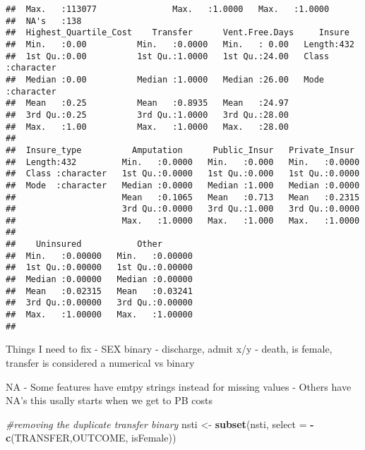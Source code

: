 \documentclass[]{article}
\newenvironment{Shaded}{\begin{snugshade}}{\end{snugshade}}
\newcommand{\CommentTok}[1]{\textcolor[rgb]{0.56,0.35,0.01}{\textit{#1}}}
\newcommand{\DataTypeTok}[1]{\textcolor[rgb]{0.13,0.29,0.53}{#1}}
\newcommand{\KeywordTok}[1]{\textcolor[rgb]{0.13,0.29,0.53}{\textbf{#1}}}
\newcommand{\NormalTok}[1]{#1}
\newcommand{\OperatorTok}[1]{\textcolor[rgb]{0.81,0.36,0.00}{\textbf{#1}}}
\newcommand{\StringTok}[1]{\textcolor[rgb]{0.31,0.60,0.02}{#1}}
\begin{document}
\begin{verbatim}
##  Max.   :113077               Max.   :1.0000   Max.   :1.0000  
##  NA's   :138                                                   
##  Highest_Quartile_Cost    Transfer      Vent.Free.Days     Insure         
##  Min.   :0.00          Min.   :0.0000   Min.   : 0.00   Length:432        
##  1st Qu.:0.00          1st Qu.:1.0000   1st Qu.:24.00   Class :character  
##  Median :0.00          Median :1.0000   Median :26.00   Mode  :character  
##  Mean   :0.25          Mean   :0.8935   Mean   :24.97                     
##  3rd Qu.:0.25          3rd Qu.:1.0000   3rd Qu.:28.00                     
##  Max.   :1.00          Max.   :1.0000   Max.   :28.00                     
##                                                                           
##  Insure_type          Amputation      Public_Insur   Private_Insur   
##  Length:432         Min.   :0.0000   Min.   :0.000   Min.   :0.0000  
##  Class :character   1st Qu.:0.0000   1st Qu.:0.000   1st Qu.:0.0000  
##  Mode  :character   Median :0.0000   Median :1.000   Median :0.0000  
##                     Mean   :0.1065   Mean   :0.713   Mean   :0.2315  
##                     3rd Qu.:0.0000   3rd Qu.:1.000   3rd Qu.:0.0000  
##                     Max.   :1.0000   Max.   :1.000   Max.   :1.0000  
##                                                                      
##    Uninsured           Other        
##  Min.   :0.00000   Min.   :0.00000  
##  1st Qu.:0.00000   1st Qu.:0.00000  
##  Median :0.00000   Median :0.00000  
##  Mean   :0.02315   Mean   :0.03241  
##  3rd Qu.:0.00000   3rd Qu.:0.00000  
##  Max.   :1.00000   Max.   :1.00000  
## 
\end{verbatim}

Things I need to fix - SEX binary - discharge, admit x/y - death, is
female, transfer is considered a numerical vs binary

NA - Some features have emtpy strings instead for missing values -
Others have NA's this usally starts when we get to PB costs

\begin{Shaded}
\begin{Highlighting}[]
\CommentTok{#removing the duplicate transfer binary }
\NormalTok{nsti <-}\StringTok{ }\KeywordTok{subset}\NormalTok{(nsti, }\DataTypeTok{select =} \OperatorTok{-}\KeywordTok{c}\NormalTok{(TRANSFER,OUTCOME, isFemale))}
\end{Highlighting}
\end{Shaded}
\end{document}
